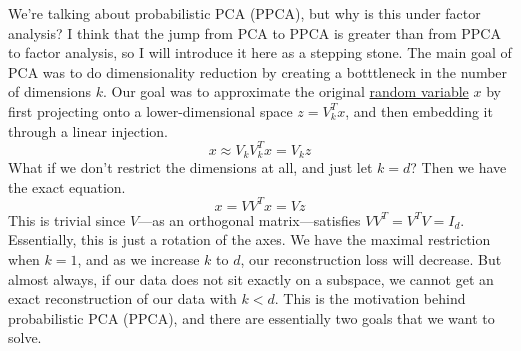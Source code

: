  We're talking about probabilistic PCA (PPCA), but why is this under factor analysis? I think that the jump from PCA to PPCA is greater than from PPCA to factor analysis, so I will introduce it here as a stepping stone. The main goal of PCA was to do dimensionality reduction by creating a botttleneck in the number of dimensions $k$. Our goal was to approximate the original \hyperref[prob-def:random-variable]{random variable} $x$ by first projecting onto a lower-dimensional space $z = V_k^T x$, and then embedding it through a linear injection. 
  \begin{equation}
    x \approx V_k V_k^T x = V_k z 
  \end{equation} 
  What if we don't restrict the dimensions at all, and just let $k = d$? Then we have the exact equation. 
  \begin{equation}
    x = V V^T x = V z
  \end{equation}
  This is trivial since $V$---as an orthogonal matrix---satisfies $V V^T = V^T V = I_d$. Essentially, this is just a rotation of the axes. We have the maximal restriction when $k = 1$, and as we increase  $k$ to $d$, our reconstruction loss will decrease. But almost always, if our data does not sit exactly on a subspace, we cannot get an exact reconstruction of our data with $k < d$. This is the motivation behind probabilistic PCA (PPCA), and there are essentially two goals that we want to solve. \cite{1999tipping} 
